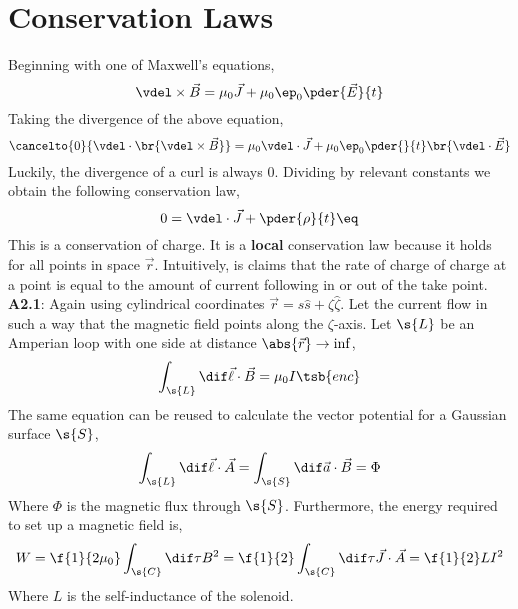 \documentclass{article}
\begin{document}
\section{Conservation Laws}
Beginning with one of Maxwell's equations,
\[ \vdel \times \vec{B} = \mu_0 \vec{J} + \mu_0 \ep_0 \pder{\vec{E}}{t} \]
Taking the divergence of the above equation,
\[ \cancelto{0}{\vdel \cdot \br{\vdel \times \vec{B}}} = \mu_0 \vdel \cdot \vec{J} + \mu_0 \ep_0 \pder{}{t}\br{\vdel \cdot \vec{E}} \]
Luckily, the divergence of a curl is always $0$. Dividing by relevant constants we obtain the following conservation law,
\[ 0 = \vdel \cdot \vec{J} + \pder{\rho}{t} \eq \label{eq:conservation_charge}\]
This is a conservation of charge. It is a \textbf{local} conservation law because it holds for all points in space $\vec{r}$. Intuitively, is claims that the rate of charge of charge at a point is equal to the amount of current following in or out of the take point. \\

\textbf{A2.1}: Again using cylindrical coordinates $\vec{r} = s \hat{s} + \zeta \hat{\zeta}$. Let the current flow in such a way that the magnetic field points along the $\zeta$-axis. Let $\s{L}$ be an Amperian loop with one side at distance $\abs{\vec{r}} \to \inf$,
\[ \int_{\s{L}} \dif \vec{\ell} \cdot \vec{B} = \mu_0 I\tsb{enc} \]
The same equation can be reused to calculate the vector potential for a Gaussian surface $\s{S}$,
\[ \int_{\s{L}} \dif \vec{\ell} \cdot \vec{A} = \int_{\s{S}} \dif \vec{a} \cdot \vec{B} = \Phi \]
Where $\Phi$ is the magnetic flux through $\s{S}$. Furthermore, the energy required to set up a magnetic field is,
\[ W = \f{1}{2 \mu_0} \int_{\s{C}} \dif \tau B^2 = \f{1}{2} \int_{\s{C}} \dif \tau \vec{J} \cdot \vec{A} = \f{1}{2} L I^2 \]
Where $L$ is the self-inductance of the solenoid.
\end{document}
